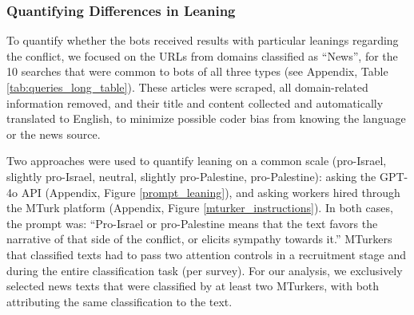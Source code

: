 \subsubsection{Quantifying Differences in Leaning}
To quantify whether the bots received results with particular leanings regarding the conflict, we focused on the URLs from domains classified as ``News'', for the 10 searches that were common to bots of all three types (see Appendix, Table \ref{tab:queries_long_table}). These articles were scraped, all domain-related information removed, and their title and content collected and automatically translated to English, to minimize possible coder bias from knowing the language or the news source.

Two approaches were used to quantify leaning on a common scale (pro-Israel, slightly pro-Israel, neutral, slightly pro-Palestine, pro-Palestine): asking the GPT-4o API (Appendix, Figure \ref{prompt_leaning}), and asking workers hired through the MTurk platform (Appendix, Figure \ref{mturker_instructions}). In both cases, the prompt was: ``Pro-Israel or pro-Palestine means that the text favors the narrative of that side of the conflict, or elicits sympathy towards it.'' MTurkers that classified texts had to pass two attention controls in a recruitment stage and during the entire classification task (per survey). For our analysis, we exclusively selected news texts that were classified by at least two MTurkers, with both attributing the same classification to the text.
 